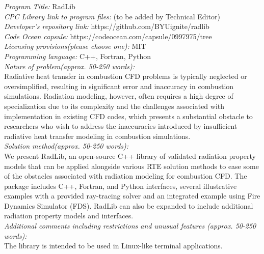 \documentclass[preprint,12pt]{elsarticle}
\begin{document}
    \begin{small}
        \noindent
        {\em Program Title:} RadLib                                         \\
        {\em CPC Library link to program files:} (to be added by Technical Editor) \\
        {\em Developer's repository link:} https://github.com/BYUignite/radlib \\
        {\em Code Ocean capsule:} https://codeocean.com/capsule/0997975/tree \\
        {\em Licensing provisions(please choose one):} MIT \\
        {\em Programming language:} C++, Fortran, Python \\
        {\em Nature of problem(approx. 50-250 words):} \\
        Radiative heat transfer in combustion CFD problems is typically neglected or oversimplified, resulting in significant error and inaccuracy in combustion simulations. Radiation modeling, however, often requires a high degree of specialization due to its complexity and the challenges associated with implementation in existing CFD codes, which presents a substantial obstacle to researchers who wish to address the inaccuracies introduced by insufficient radiative heat transfer modeling in combustion simulations. \\
        {\em Solution method(approx. 50-250 words):}\\
        We present RadLib, an open-source C++ library of validated radiation property models that can be applied
        alongside various RTE solution methods to ease some of the obstacles associated with radiation modeling for
        combustion CFD. The package includes C++, Fortran, and Python interfaces, several illustrative examples with
        a provided ray-tracing solver and an integrated example using Fire Dynamics Simulator (FDS).
        RadLib can also be expanded to include additional radiation property models and interfaces.\\
        {\em Additional comments including restrictions and unusual features (approx. 50-250 words):}\\
        The library is intended to be used in Linux-like terminal applications.
        \\

    \end{small}

\end{document}
